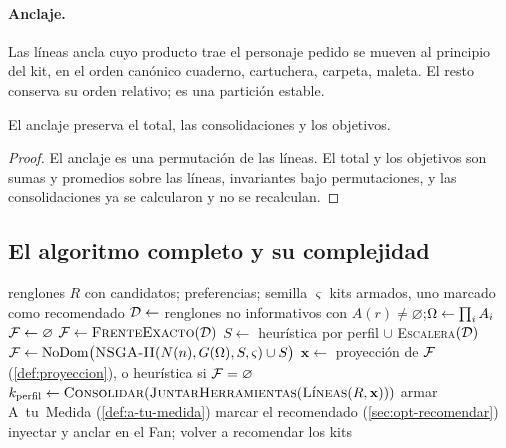 \paragraph{Anclaje.} Las líneas ancla cuyo producto trae el personaje pedido
se mueven al principio del kit, en el orden canónico cuaderno, cartuchera,
carpeta, maleta. El resto conserva su orden relativo; es una partición
estable.

\begin{proposicion}
El anclaje preserva el total, las consolidaciones y los objetivos.
\end{proposicion}

\begin{proof}
El anclaje es una permutación de las líneas. El total y los objetivos son
sumas y promedios sobre las líneas, invariantes bajo permutaciones, y las
consolidaciones ya se calcularon y no se recalculan.
\end{proof}

\subsection{El algoritmo completo y su complejidad}
\label{sec:opt-completo}

\begin{algorithm}[htbp]
\caption{Armar los kits de un hogar}
\label{alg:armar}
\begin{algorithmic}[1]
\Require renglones $R$ con candidatos; preferencias; semilla $\varsigma$
\Ensure kits armados, uno marcado como recomendado
\State $\mathcal{D}\gets$ renglones no informativos con $A(r)\neq\varnothing$;\quad $\Omega\gets\prod_iA_i$
 $\mathcal{F}\gets\varnothing$
 $\mathcal{F}\gets\textsc{FrenteExacto}(\mathcal{D})$ 
\Else
  \State $S\gets$ heurística por perfil $\cup$ \textsc{Escalera}$(\mathcal{D})$ 
  \State $\mathcal{F}\gets\mathrm{NoDom}\bigl(\textsc{NSGA-II}(N(n),G(\Omega),S,\varsigma)\cup S\bigr)$ 
\EndIf
{}
  \State $\mathbf{x}\gets$ proyección de $\mathcal{F}$ (\cref{def:proyeccion}), o heurística si $\mathcal{F}=\varnothing$
  \State $k_{\text{perfil}}\gets\textsc{Consolidar}(\textsc{JuntarHerramientas}(\textsc{Líneas}(R,\mathbf{x})))$
\EndFor
{} armar A~tu~Medida (\cref{def:a-tu-medida}) \EndIf
\State marcar el recomendado (\cref{sec:opt-recomendar})
 inyectar y anclar en el Fan; volver a recomendar \EndIf
\State \Return los kits
\end{algorithmic}
\end{algorithm}

